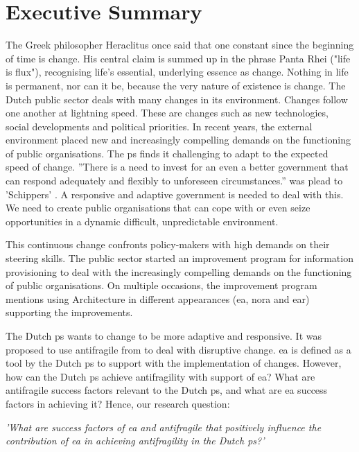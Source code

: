 \chapter*{Executive Summary}
\label{executivesummary}
The Greek philosopher Heraclitus once said that one constant since the beginning of time is change. His central claim is summed up in the phrase Panta Rhei ("life is flux"), recognising life's essential, underlying essence as change. Nothing in life is permanent, nor can it be, because the very nature of existence is change. The Dutch public sector deals with many changes in its environment. Changes follow one another at lightning speed. These are changes such as new technologies, social developments and political priorities. In recent years, the external environment placed new and increasingly compelling demands on the functioning of public organisations. The \gls{ps} finds it challenging to adapt to the expected speed of change. ''There is a need to invest for an even a better government that can respond adequately and flexibly to unforeseen circumstances.'' was plead to 'Schippers' \parencite{Secretarissen-generaal2018}. A responsive and adaptive government is needed to deal with this. We need to create public organisations that can cope with or even seize opportunities in a dynamic difficult, unpredictable environment. 

This continuous change confronts policy-makers with high demands on their steering skills. The public sector started an improvement program for information provisioning to deal with the increasingly compelling demands on the functioning of public organisations. On multiple occasions, the improvement program mentions using Architecture in different appearances (\gls{ea}, \acrfull{nora} and \acrfull{ear}) supporting the improvements.

The Dutch \gls{ps} wants to change to be more adaptive and responsive. It was proposed to use \gls{antifragile} from \textcite{Taleb2012} to deal with disruptive change. \gls{ea} is defined as a tool by the Dutch \gls{ps} to support with the implementation of changes. However, how can the Dutch \gls{ps} achieve \gls{antifragility} with support of \gls{ea}? What are \gls{antifragile} success factors relevant to the Dutch \gls{ps}, and what are \gls{ea} success factors in achieving it? Hence, our research question:

\vspace{\baselineskip}
\noindent \emph{'What are success factors of \gls{ea} and \gls{antifragile} that positively influence the contribution of \gls{ea} in achieving \gls{antifragility} in the Dutch \gls{ps}?'}
\vspace{\baselineskip}

